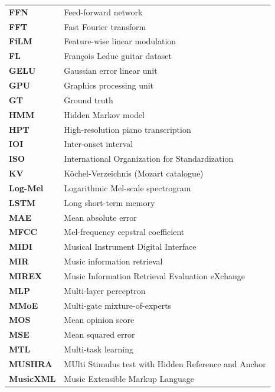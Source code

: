 \begin{longtable}{@{}p{} p{}@{}}
\textbf{FFN}       & Feed-forward network \\
\textbf{FFT}       & Fast Fourier transform \\
\textbf{FiLM}      & Feature-wise linear modulation \\
\textbf{FL}        & Fran\c{c}ois Leduc guitar dataset \\

\textbf{GELU}      & Gaussian error linear unit \\
\textbf{GPU}       & Graphics processing unit \\
\textbf{GT}        & Ground truth \\

\textbf{HMM}       & Hidden Markov model \\
\textbf{HPT}       & High-resolution piano transcription \\

\textbf{IOI}       & Inter-onset interval \\
\textbf{ISO}       & International Organization for Standardization \\

\textbf{KV}        & K\"ochel-Verzeichnis (Mozart catalogue) \\

\textbf{Log-Mel}   & Logarithmic Mel-scale spectrogram \\
\textbf{LSTM}      & Long short-term memory \\

\textbf{MAE}       & Mean absolute error \\
\textbf{MFCC}      & Mel-frequency cepstral coefficient \\
\textbf{MIDI}      & Musical Instrument Digital Interface \\
\textbf{MIR}       & Music information retrieval \\
\textbf{MIREX}     & Music Information Retrieval Evaluation eXchange \\
\textbf{MLP}       & Multi-layer perceptron \\
\textbf{MMoE}      & Multi-gate mixture-of-experts \\
\textbf{MOS}       & Mean opinion score \\
\textbf{MSE}       & Mean squared error \\
\textbf{MTL}       & Multi-task learning \\
\textbf{MUSHRA}    & MUlti Stimulus test with Hidden Reference and Anchor \\
\textbf{MusicXML}  & Music Extensible Markup Language \\
    

\end{longtable}
